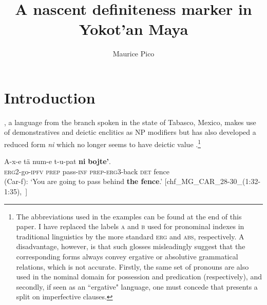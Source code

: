 \documentclass[output=paper
,modfonts
,nonflat]{langsci/langscibook}
\author{%
Maurice Pico\affiliation{Leiden University}}
\title{A nascent definiteness marker in Yokot'an Maya}
\begin{document}
\maketitle

\section{Introduction}\label{sec:pico:1}

, a  language from the  branch spoken in the state of Tabasco, Mexico, makes use of demonstratives and deictic enclitics as NP modifiers but has also developed a reduced form \textit{ni} which no longer seems to have deictic value .\footnote{The abbreviations used in the examples can be found at the end of this paper. I have replaced the labels \textsc{a} and \textsc{b} used for pronominal indexes in traditional  linguistics by the more standard \textsc{erg} and \textsc{abs}, respectively. A disadvantage, however, is that such glosses misleadingly suggest that the corresponding forms always convey ergative or absolutive grammatical relations, which is not accurate. Firstly, the same set of pronouns are also used in the nominal domain for possession and predication (respectively), and secondly, if seen as an ``ergative" language, one must concede that  presents a split on imperfective clauses. }

\ea \label{ex:pico:1}
\gll A-x-e tä num-e t-u-pat \textbf{ni} \textbf{bojte'}.\\
\textsc{erg2}-go-\textsc{ipfv} \textsc{prep} pass-\textsc{inf} \textsc{prep}-\textsc{erg3}-back \textsc{det} fence\\
\glt (Car-f): `You are going to pass behind \textbf{the fence}.' [chf\_MG\_CAR\_28-30\_(1:32-1:35),~\citealt{Delgado-Galvan2018archive}]
\z
\end{document}
